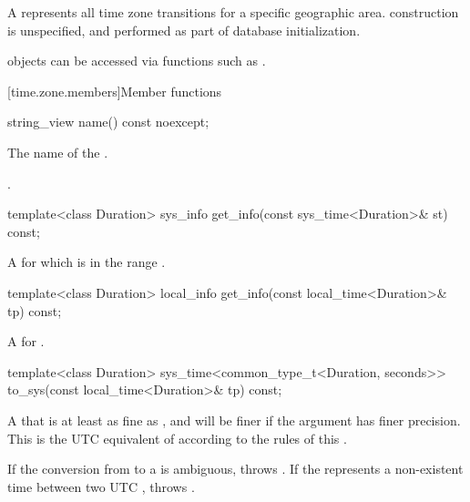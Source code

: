 \pnum
A  represents all time zone transitions
for a specific geographic area.
 construction is unspecified,
and performed as part of database initialization.
\begin{note}
 objects can be accessed
via functions such as .
\end{note}

[time.zone.members]{Member functions}

%
\begin{itemdecl}
string_view name() const noexcept;
\end{itemdecl}

\begin{itemdescr}
\pnum
\returns
The name of the .

\pnum
\begin{example}
.
\end{example}
\end{itemdescr}

%
\begin{itemdecl}
template<class Duration>
  sys_info get_info(const sys_time<Duration>& st) const;
\end{itemdecl}

\begin{itemdescr}
\pnum
\returns
A   for which
 is in the range .
\end{itemdescr}

%
\begin{itemdecl}
template<class Duration>
  local_info get_info(const local_time<Duration>& tp) const;
\end{itemdecl}

\begin{itemdescr}
\pnum
\returns
A  for .
\end{itemdescr}

%
\begin{itemdecl}
template<class Duration>
  sys_time<common_type_t<Duration, seconds>>
    to_sys(const local_time<Duration>& tp) const;
\end{itemdecl}

\begin{itemdescr}
\pnum
\returns
A  that is at least as fine as ,
and will be finer if the argument  has finer precision.
This  is the UTC equivalent of 
according to the rules of this .

\pnum
\throws
If the conversion from  to a  is ambiguous,
throws .
If the  represents a non-existent time between two UTC ,
throws .
\end{itemdescr}

